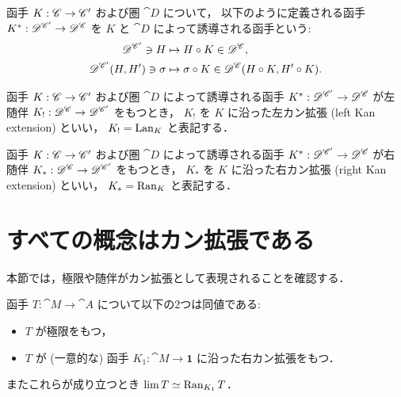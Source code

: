 \documentclass[titlepage]{ltjsreport}
\newtheorem[S]{theorem}{定理}[chapter]
\newtheorem[S]{definition}[theorem]{定義}
\newtheorem[S]{example}[theorem]{例}
\begin{document}
\begin{definition}[函手の誘導]
  \def\C{\cat{C}}%
  \def\A{\cat{C'}}%
  \def\D{\cat{D}}%
  \def\K{K}%
  \def\h{H}%
  函手 $\mrp{\K}{\C}{\A}$ および圏 $\D$ について，
  以下のように定義される函手 $\mrp{\K^*}{\D^\A}{\D^\C}$ を
  $\K$ と $\D$ によって誘導される函手という:
  \begin{align}
    \objs{\D^\A}\ni\h
     & \mapsto\h\circ\K\in\objs{\D^\C},                            \\
    \mrps{\D^\A}{\h}{\h'}\ni\sigma
     & \mapsto\sigma\circ\K\in\mrps{\D^\C}{\h\circ\K}{\h'\circ\K}.
  \end{align}
\end{definition}
\begin{definition}[左カン拡張]
  \def\C{\cat{C}}%
  \def\A{\cat{C'}}%
  \def\D{\cat{D}}%
  \def\K{K}%
  \def\L{\K_!}%
  函手 $\mrp{\K}{\C}{\A}$ および圏 $\D$ によって誘導される函手
  $\mrp{\K^*}{\D^\A}{\D^\C}$ が左随伴 $\mrp{\L}{\D^\C}{\D^\A}$ をもつとき，
  $\L$ を $\K$ に沿った左カン拡張 (left Kan extension) といい，
  $\L=\lan_{\K}$ と表記する．
\end{definition}
\begin{definition}[右カン拡張]
  \def\C{\cat{C}}%
  \def\A{\cat{C'}}%
  \def\D{\cat{D}}%
  \def\K{K}%
  \def\R{\K_*}%
  函手 $\mrp{\K}{\C}{\A}$ および圏 $\D$ によって誘導される函手
  $\mrp{\K^*}{\D^\A}{\D^\C}$ が右随伴 $\mrp{\R}{\D^\C}{\D^\A}$ をもつとき，
  $\R$ を $\K$ に沿った右カン拡張 (right Kan extension) といい，
  $\R=\ran_{\K}$ と表記する．
\end{definition}
\begin{center}
  
  \hspace{20pt}
  
\end{center}

\section{すべての概念はカン拡張である}

本節では，極限や随伴がカン拡張として表現されることを確認する．

\begin{theorem}[極限は右カン拡張である]\label{thm:limit-is-right-kan-extension}
  函手 $T:\cat{M}\to\cat{A}$ について以下の2つは同値である:
  \begin{itemize}
    \item $T$ が極限をもつ，
    \item $T$ が (一意的な) 函手 $K_1:\cat{M}\to\mathbf{1}$
          に沿った右カン拡張をもつ．
  \end{itemize}
  またこれらが成り立つとき $\lim T\simeq\operatorname{Ran}_{K_1}T$．
\end{theorem}
\end{document}
